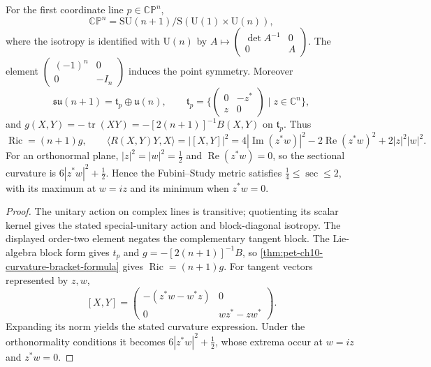 \begin{example}
  \label{ex:pet-ch10-complex-projective-space}
  For the first coordinate line $p\in\mathbb{CP}^n$,
  \[
    \mathbb{CP}^n
      =\mathrm{SU}(n+1)/\mathrm S(\mathrm U(1)\times\mathrm U(n)),
  \]
  where the isotropy is identified with $\mathrm U(n)$ by
  $A\mapsto\left(\begin{smallmatrix}\det A^{-1}&0\\0&A\end{smallmatrix}\right)$.
  The element
  $\left(\begin{smallmatrix}(-1)^n&0\\0&-I_n\end{smallmatrix}\right)$ induces
  the point symmetry. Moreover
  \[
    \mathfrak{su}(n+1)=\mathfrak t_p\oplus\mathfrak u(n),\qquad
    \mathfrak t_p=\Big\{\begin{pmatrix}0&-z^*\\z&0\end{pmatrix}\mid z\in\mathbb C^n\Big\},
  \]
  and $g(X,Y)=-\operatorname{tr}(XY)=-[2(n+1)]^{-1}B(X,Y)$ on $\mathfrak t_p$.
  Thus
  \[
    \operatorname{Ric}=(n+1)g,\qquad
    \langle R(X,Y)Y,X\rangle=|[X,Y]|^2=4|\operatorname{Im}(z^*w)|^2-2\operatorname{Re}(z^*w)^2+2|z|^2|w|^2.
  \]
  For an orthonormal plane, $|z|^2=|w|^2=\tfrac12$ and
  $\operatorname{Re}(z^*w)=0$, so the sectional curvature is
  $6|z^*w|^2+\tfrac12$. Hence the Fubini--Study metric satisfies
  $\tfrac14\le\sec\le2$, with its maximum at $w=iz$ and its minimum when
  $z^*w=0$.
\end{example}
\begin{proof}
  \sketch
  The unitary action on complex lines is transitive; quotienting its scalar
  kernel gives the stated special-unitary action and block-diagonal isotropy.
  The displayed order-two element negates the complementary tangent block.
  The Lie-algebra block form gives $t_p$ and
  $g=-[2(n+1)]^{-1}B$, so
  \cref{thm:pet-ch10-curvature-bracket-formula} gives
  $\operatorname{Ric}=(n+1)g$. For tangent vectors represented by $z,w$,
  \[
    [X,Y]=\begin{pmatrix}-(z^*w-w^*z)&0\\0&wz^*-zw^*\end{pmatrix}.
  \]
  Expanding its norm yields the stated curvature expression. Under the
  orthonormality conditions it becomes $6|z^*w|^2+\tfrac12$, whose extrema
  occur at $w=iz$ and $z^*w=0$.
\end{proof}

